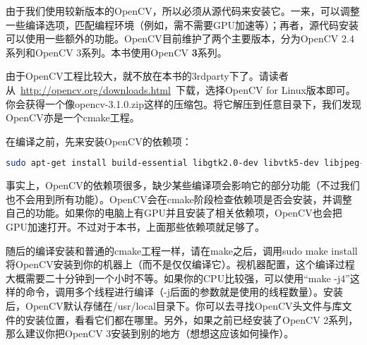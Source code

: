 由于我们使用较新版本的OpenCV，所以必须从源代码来安装它。一来，可以调整一些编译选项，匹配编程环境（例如，需不需要GPU加速等）；再者，源代码安装可以使用一些额外的功能。OpenCV目前维护了两个主要版本，分为OpenCV 2.4系列和OpenCV 3系列。本书使用OpenCV \textbf{3}系列。

由于OpenCV工程比较大，就不放在本书的3rdparty下了。请读者从~\url{http://opencv.org/downloads.html}~下载，选择OpenCV for Linux版本即可。你会获得一个像opencv-3.1.0.zip这样的压缩包。将它解压到任意目录下，我们发现OpenCV亦是一个cmake工程。

在编译之前，先来安装OpenCV的依赖项：
\begin{lstlisting}[language=sh,caption=终端输入：]
sudo apt-get install build-essential libgtk2.0-dev libvtk5-dev libjpeg-dev libtiff4-dev libjasper-dev libopenexr-dev libtbb-dev
\end{lstlisting}

事实上，OpenCV的依赖项很多，缺少某些编译项会影响它的部分功能（不过我们也不会用到所有功能）。OpenCV会在cmake阶段检查依赖项是否会安装，并调整自己的功能。如果你的电脑上有GPU并且安装了相关依赖项，OpenCV也会把GPU加速打开。不过对于本书，上面那些依赖项就足够了。

随后的编译安装和普通的cmake工程一样，请在make之后，调用sudo make install将OpenCV安装到你的机器上（而不是仅仅编译它）。视机器配置，这个编译过程大概需要二十分钟到一个小时不等。如果你的CPU比较强，可以使用“make -j4”这样的命令，调用多个线程进行编译（-j后面的参数就是使用的线程数量）。安装后，OpenCV默认存储在/usr/local目录下。你可以去寻找OpenCV头文件与库文件的安装位置，看看它们都在哪里。另外，如果之前已经安装了OpenCV 2系列，那么建议你把OpenCV 3安装到别的地方（想想这应该如何操作）。

